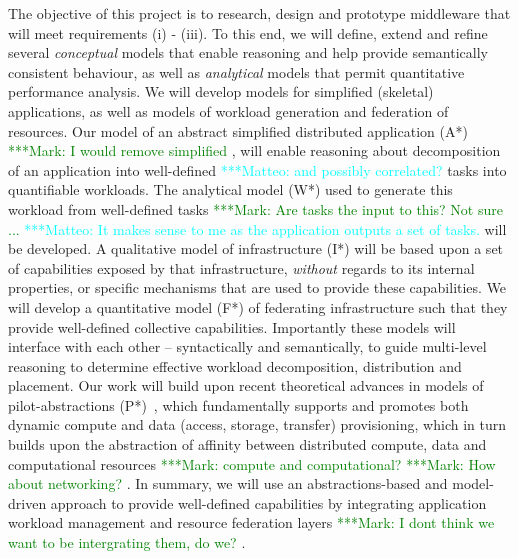 \documentclass[11pt,final]{article}
\newcommand{\I}[1]{\textit{#1}}
\newcommand{\msnote}[1]{ {\textcolor{green} { ***Mark: #1 }}}
\newcommand{\mtnote}[1]{ {\textcolor{cyan} { ***Matteo: #1 }}}
\newcommand{\msnote}[1]{}
\newcommand{\mtnote}[1]{}
\begin{document}
{ The objective of this project is to
research, design and prototype middleware that will
meet requirements (i) - (iii).  To this end, we will define, extend and refine
several {\it conceptual} models that enable reasoning and help provide
semantically consistent behaviour, as well as {\it   analytical} models that
permit quantitative performance analysis. We will develop models for simplified
(skeletal) applications, as well as models of workload generation and
federation of resources.  Our model of an abstract simplified distributed
application (A*) \msnote{I would remove simplified}, will enable reasoning
about decomposition of an application into well-defined \mtnote{and possibly 
correlated?} tasks into quantifiable
workloads. The analytical model (W*) used to generate this workload from 
well-defined tasks \msnote{Are tasks the input to this? Not sure ...}\mtnote{It 
makes sense to me as the application outputs a set of tasks.} will be
developed.  A qualitative model of infrastructure (I*) will be based upon a set
of capabilities exposed by that infrastructure, \I{without} regards to its
internal properties, or specific mechanisms that are used to provide these
capabilities. We will develop a quantitative model (F*) of federating
infrastructure such that they provide well-defined collective capabilities.
Importantly these models will interface with each other -- syntactically and
semantically, to guide multi-level reasoning to determine effective workload
decomposition, distribution and placement.  Our work will build upon recent
theoretical advances in models of pilot-abstractions (P*)~\cite{pstar}, which
fundamentally supports and promotes both dynamic compute and data (access,
storage, transfer) provisioning, which in turn builds upon the abstraction of
affinity between distributed compute, data and computational
resources\msnote{compute and computational?} \msnote{How about networking?}. In
summary, we will use an abstractions-based and model-driven approach to provide
well-defined capabilities by integrating application workload management and
resource federation layers\msnote{I dont think we want to be intergrating them,
do we?}.

}
\end{document}
